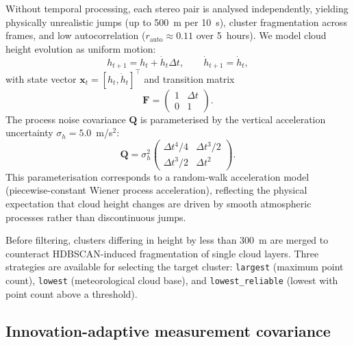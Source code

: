 \documentclass[preprint,
superscriptaddress,
amsmath,amssymb,aps,
twoside,final,secnumarabic,
nofootinbib]{revtex4-2}
\begin{document}
Without temporal processing, each stereo pair is analysed independently, yielding physically unrealistic jumps (up to 500~m per 10~s), cluster fragmentation across frames, and low autocorrelation ($r_\text{auto} \approx 0.11$ over 5~hours). We model cloud height evolution as uniform motion:
\begin{equation}
h_{t+1} = h_t + \dot{h}_t \Delta t, \qquad \dot{h}_{t+1} = \dot{h}_t,
\end{equation}
with state vector $\mathbf{x}_t = [h_t, \dot{h}_t]^\top$ and transition matrix
\begin{equation}
\mathbf{F} = \begin{pmatrix} 1 & \Delta t \\ 0 & 1 \end{pmatrix}.
\end{equation}
The process noise covariance $\mathbf{Q}$ is parameterised by the vertical acceleration uncertainty $\sigma_h = 5.0$~m/s$^2$:
\begin{equation}
\mathbf{Q} = \sigma_h^2 \begin{pmatrix} \Delta t^4/4 & \Delta t^3/2 \\ \Delta t^3/2 & \Delta t^2 \end{pmatrix}.
\end{equation}
This parameterisation corresponds to a random-walk acceleration model (piecewise-constant Wiener process acceleration), reflecting the physical expectation that cloud height changes are driven by smooth atmospheric processes rather than discontinuous jumps.

Before filtering, clusters differing in height by less than 300~m are merged to counteract HDBSCAN-induced fragmentation of single cloud layers. Three strategies are available for selecting the target cluster: \texttt{largest} (maximum point count), \texttt{lowest} (meteorological cloud base), and \texttt{lowest\_reliable} (lowest with point count above a threshold).

\subsection{Innovation-adaptive measurement covariance}
\end{document}
